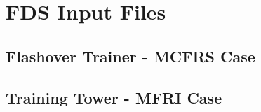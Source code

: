 \documentclass[11pt]{book}
\newcommand{\fdsinput}[1]{
{
\scriptsize

}
}
\begin{document}
\chapter{FDS Input Files}


\section{Flashover Trainer - MCFRS Case}
\fdsinput{MCFRS/MCFRS_Flashover/MCFRS_Flashover_00.fds}



\section{Training Tower - MFRI Case}
\fdsinput{MFRI/MFRI_Training_Tower/MFRI_Training_Tower_01_avg.fds}
\end{document}
